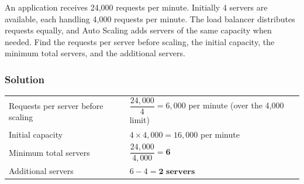 \documentclass[11pt,a4paper]{article}
\begin{document}
An application receives 24,000 requests per minute. Initially 4 servers are available, each
handling 4,000 requests per minute. The load balancer distributes requests equally, and Auto
Scaling adds servers of the same capacity when needed. Find the requests per server before
scaling, the initial capacity, the minimum total servers, and the additional servers.

\subsubsection*{Solution}

\begin{tabularx}{\textwidth}{@{}lX@{}}
Requests per server before scaling & $\dfrac{24{,}000}{4} = 6{,}000$ per minute (over the
  4,000 limit) \\[8pt]
Initial capacity & $4 \times 4{,}000 = 16{,}000$ per minute \\
Minimum total servers & $\dfrac{24{,}000}{4{,}000} = \textbf{6}$ \\[8pt]
Additional servers & $6 - 4 = \textbf{2 servers}$ \\
\end{tabularx}
\end{document}
